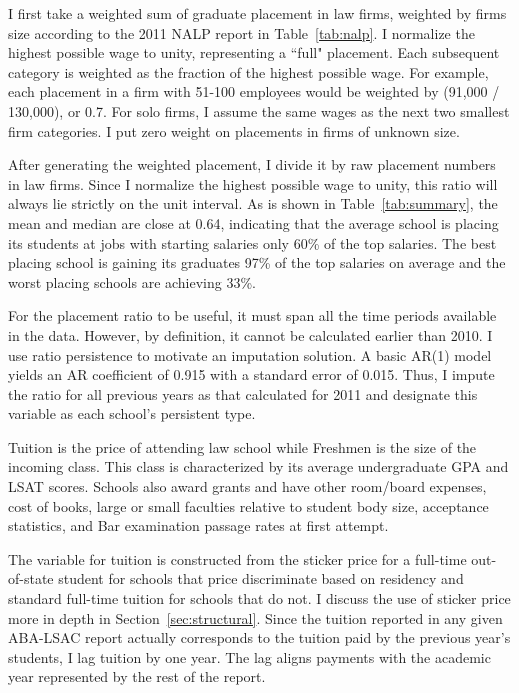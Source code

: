 \documentclass[12pt]{article}
\theoremstyle{definition}
\begin{document}
I first take a weighted sum of graduate placement in law firms, weighted by firms size according to the 2011 NALP report in Table~\ref{tab:nalp}. I normalize the highest possible wage to unity, representing a ``full" placement. Each subsequent category is weighted as the fraction of the highest possible wage. For example, each placement in a firm with 51-100 employees would be weighted by (91,000 / 130,000), or 0.7. For solo firms, I assume the same wages as the next two smallest firm categories. I put zero weight on placements in firms of unknown size.

After generating the weighted placement, I divide it by raw placement numbers in law firms. Since I normalize the highest possible wage to unity, this ratio will always lie strictly on the unit interval. As is shown in Table~\ref{tab:summary}, the mean and median are close at 0.64, indicating that the average school is placing its students at jobs with starting salaries only 60\% of the top salaries. The best placing school is gaining its graduates 97\% of the top salaries on average and the worst placing schools are achieving 33\%.

For the placement ratio to be useful, it must span all the time periods available in the data. However, by definition, it cannot be calculated earlier than 2010. I use ratio persistence to motivate an imputation solution. A basic AR(1) model yields an AR coefficient of 0.915 with a standard error of 0.015. Thus, I impute the ratio for all previous years as that calculated for 2011 and designate this variable as each school's persistent type.

Tuition is the price of attending law school while Freshmen is the size of the incoming class. This class is characterized by its average undergraduate GPA and LSAT scores. Schools also award grants and have other room/board expenses, cost of books, large or small faculties relative to student body size, acceptance statistics, and Bar examination passage rates at first attempt.

The variable for tuition is constructed from the sticker price for a full-time out-of-state student for schools that price discriminate based on residency and standard full-time tuition for schools that do not. I discuss the use of sticker price more in depth in Section~\ref{sec:structural}. Since the tuition reported in any given ABA-LSAC report actually corresponds to the tuition paid by the previous year's students, I lag tuition by one year. The lag aligns payments with the academic year represented by the rest of the report.
\end{document}
